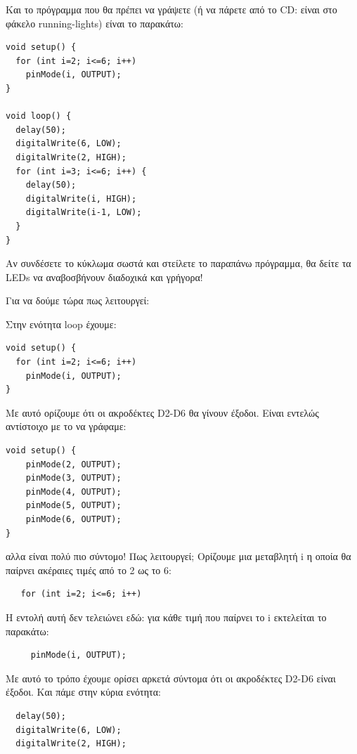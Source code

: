 \documentclass[a4paper,twoside,12pt]{article}
\begin{document}
Και το πρόγραμμα που θα πρέπει να γράψετε (ή να πάρετε από το CD: είναι στο φάκελο running-lights) είναι το παρακάτω:

\begin{verbatim}
void setup() {
  for (int i=2; i<=6; i++)
    pinMode(i, OUTPUT);
}

void loop() {
  delay(50);
  digitalWrite(6, LOW);
  digitalWrite(2, HIGH);
  for (int i=3; i<=6; i++) {
    delay(50);
    digitalWrite(i, HIGH);
    digitalWrite(i-1, LOW);
  }
}
\end{verbatim}

Αν συνδέσετε το κύκλωμα σωστά και στείλετε το παραπάνω πρόγραμμα, θα δείτε τα LEDs να αναβοσβήνουν διαδοχικά και γρήγορα!

Για να δούμε τώρα πως λειτουργεί:

Στην ενότητα loop έχουμε:

\begin{verbatim}
void setup() {
  for (int i=2; i<=6; i++)
    pinMode(i, OUTPUT);
}
\end{verbatim}

Με αυτό ορίζουμε ότι οι ακροδέκτες D2-D6 θα γίνουν έξοδοι. Είναι εντελώς αντίστοιχο με το να γράφαμε:

\begin{verbatim}
void setup() {
    pinMode(2, OUTPUT);
    pinMode(3, OUTPUT);
    pinMode(4, OUTPUT);
    pinMode(5, OUTPUT);
    pinMode(6, OUTPUT);
}
\end{verbatim}

αλλα είναι πολύ πιο σύντομο! Πως λειτουργεί; Ορίζουμε μια μεταβλητή i η οποία θα παίρνει ακέραιες τιμές από το 2 ως το 6:

\begin{verbatim}
   for (int i=2; i<=6; i++)
\end{verbatim}

Η εντολή αυτή δεν τελειώνει εδώ: για κάθε τιμή που παίρνει το i εκτελείται το παρακάτω:

\begin{verbatim}
     pinMode(i, OUTPUT);
\end{verbatim}

Με αυτό το τρόπο έχουμε ορίσει αρκετά σύντομα ότι οι ακροδέκτες D2-D6 είναι έξοδοι. Και πάμε στην κύρια ενότητα:

\begin{verbatim}
  delay(50);
  digitalWrite(6, LOW);
  digitalWrite(2, HIGH);
\end{verbatim}
\end{document}
